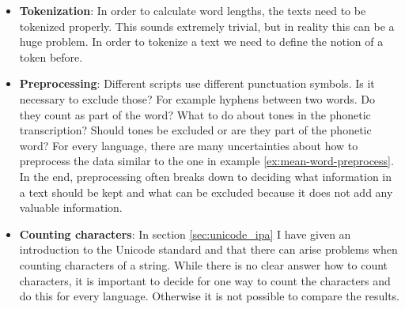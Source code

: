 \begin{itemize}
    \item \textbf{Tokenization}: In order to calculate word lengths, the texts need to be tokenized properly. This sounds extremely trivial, but in reality this can be a huge problem. In order to tokenize a text we need to define the notion of a token before. 
    \item \textbf{Preprocessing}: Different scripts use different punctuation symbols. Is it necessary to exclude those? For example hyphens between two words. Do they count as part of the word? What to do about tones in the phonetic transcription? Should tones be excluded or are they part of the phonetic word? For every language, there are many uncertainties about how to preprocess the data similar to the one in example \ref{ex:mean-word-preprocess}. In the end, preprocessing often breaks down to deciding what information in a text should be kept and what can be excluded because it does not add any valuable information.
    
    
    \item \textbf{Counting characters}: In section \ref{sec:unicode_ipa} I have given an introduction to the Unicode standard and that there can arise problems when counting characters of a string. While there is no clear answer how to count characters, it is important to decide for one way to count the characters and do this for every language. Otherwise it is not possible to compare the results. 
\end{itemize}

